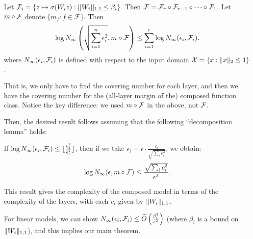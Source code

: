 Let $\mathcal F_i = \{ z \mapsto \sigma (W_i z) : ||W_i||_{1, 1} \leq \beta_i \}$. Then $\mathcal F = \mathcal F_r \circ \mathcal F_{r-1} \circ \cdots \circ \mathcal F_1$. Let $m \circ \mathcal F$ denote $\{m_f : f \in \mathcal{F} \}$. Then
\begin{equation}
\log N_\infty\left (\sqrt{\sum_{i=1}^n \epsilon_i^2}, m \circ \mathcal F \right ) \leq \sum_{i=1}^r \log N_\infty(\epsilon_i, \mathcal F_i).
\end{equation}
where $N_\infty(\epsilon_i, \mathcal F_i)$ is defined with respect to the input domain $\mathcal{X} = \{x : \|x\|_2 \leq 1 \}$.

That is, we only have to find the covering number for each layer, and then we have the covering number for the (all-layer margin of the) composed function class. Notice the key difference: we used $m \circ \mathcal F$ in the above, not $\mathcal F$.

Then, the desired result follows assuming that the following ``decomposition lemma'' holds:

\begin{lemma}
    If $\log N_\infty(\epsilon_i, \mathcal F_i) \leq \lfloor \frac{c_i^2}{\epsilon_i^2} \rfloor$, then if we take $\epsilon_i = \epsilon \cdot \frac{c_i}{\sqrt{\sum_i c_i^2}}$, we obtain:
    \begin{equation}
    \log N_\infty(\epsilon, m \circ \mathcal F) \leq \frac{\sqrt{\sum_i c_i^2}}{\epsilon^2}.
    \end{equation}
\end{lemma}
This result gives the complexity of the composed model in terms of the complexity of the layers, with each $c_i$ given by $\|W_i\|_{1, 1}$.

For linear models, we can show $N_\infty(\epsilon_i, \mathcal F_i) \leq \widetilde{O}\left (\frac{\beta_i^2}{\epsilon^2} \right )$ (where $\beta_i$ is a bound on $\|W_i\|_{1, 1}$), and this implies our main theorem.

